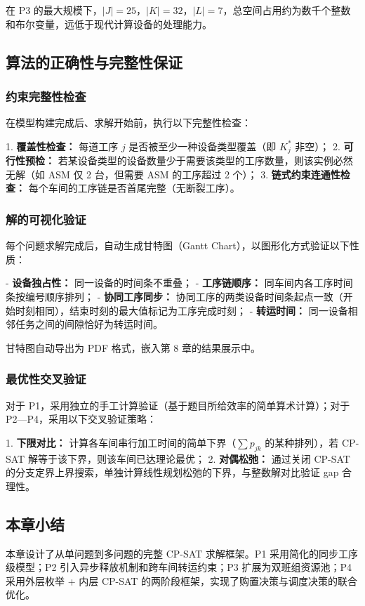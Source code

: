 \documentclass[UTF8,a4paper,12pt]{ctexart}
\begin{document}
在 P3 的最大规模下，$|J| = 25$，$|K| = 32$，$|L| = 7$，总空间占用约为数千个整数和布尔变量，远低于现代计算设备的处理能力。

\subsection{算法的正确性与完整性保证}
\subsubsection{约束完整性检查}
在模型构建完成后、求解开始前，执行以下完整性检查：

1. \textbf{覆盖性检查：} 每道工序 $j$ 是否被至少一种设备类型覆盖（即 $K_j^*$ 非空）；
2. \textbf{可行性预检：} 若某设备类型的设备数量少于需要该类型的工序数量，则该实例必然无解（如 ASM 仅 2 台，但需要 ASM 的工序超过 2 个）；
3. \textbf{链式约束连通性检查：} 每个车间的工序链是否首尾完整（无断裂工序）。

\subsubsection{解的可视化验证}
每个问题求解完成后，自动生成甘特图（Gantt Chart），以图形化方式验证以下性质：

- \textbf{设备独占性：} 同一设备的时间条不重叠；
- \textbf{工序链顺序：} 同车间内各工序时间条按编号顺序排列；
- \textbf{协同工序同步：} 协同工序的两类设备时间条起点一致（开始时刻相同），结束时刻的最大值标记为工序完成时刻；
- \textbf{转运时间：} 同一设备相邻任务之间的间隙恰好为转运时间。

甘特图自动导出为 PDF 格式，嵌入第 8 章的结果展示中。

\subsubsection{最优性交叉验证}
对于 P1，采用独立的手工计算验证（基于题目所给效率的简单算术计算）；对于 P2—P4，采用以下交叉验证策略：

1. \textbf{下限对比：} 计算各车间串行加工时间的简单下界（$\sum p_{jk}$ 的某种排列），若 CP-SAT 解等于该下界，则该车间已达理论最优；
2. \textbf{对偶松弛：} 通过关闭 CP-SAT 的分支定界上界搜索，单独计算线性规划松弛的下界，与整数解对比验证 gap 合理性。

\subsection{本章小结}
本章设计了从单问题到多问题的完整 CP-SAT 求解框架。P1 采用简化的同步工序级模型；P2 引入异步释放机制和跨车间转运约束；P3 扩展为双班组资源池；P4 采用外层枚举 + 内层 CP-SAT 的两阶段框架，实现了购置决策与调度决策的联合优化。
\end{document}
